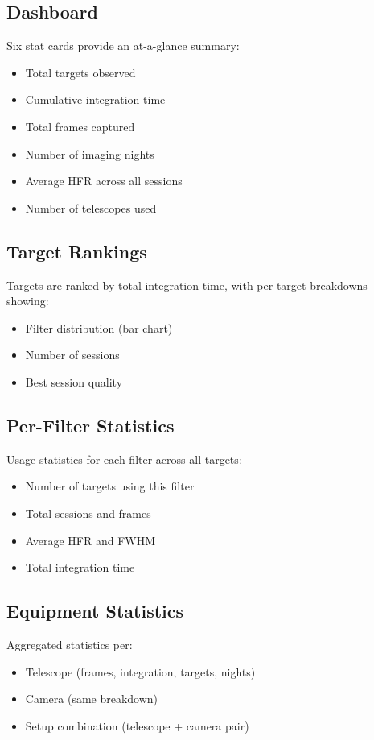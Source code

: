 \documentclass[11pt,a4paper]{article}
\begin{document}
\subsection{Dashboard}

Six stat cards provide an at-a-glance summary:
\begin{itemize}
    \item Total targets observed
    \item Cumulative integration time
    \item Total frames captured
    \item Number of imaging nights
    \item Average HFR across all sessions
    \item Number of telescopes used
\end{itemize}

\subsection{Target Rankings}

Targets are ranked by total integration time, with per-target breakdowns showing:
\begin{itemize}
    \item Filter distribution (bar chart)
    \item Number of sessions
    \item Best session quality
\end{itemize}

\subsection{Per-Filter Statistics}

Usage statistics for each filter across all targets:
\begin{itemize}
    \item Number of targets using this filter
    \item Total sessions and frames
    \item Average HFR and FWHM
    \item Total integration time
\end{itemize}

\subsection{Equipment Statistics}

Aggregated statistics per:
\begin{itemize}
    \item Telescope (frames, integration, targets, nights)
    \item Camera (same breakdown)
    \item Setup combination (telescope + camera pair)
\end{itemize}
\end{document}
